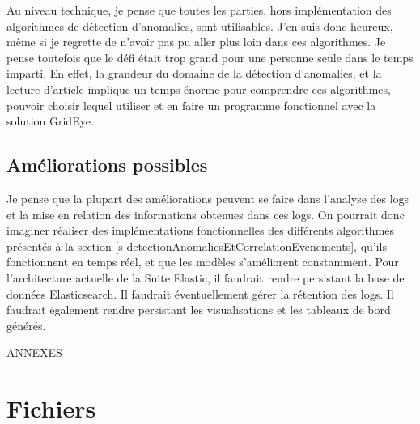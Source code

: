 \documentclass[paper=a4, fontsize=11pt]{scrartcl}
\begin{document}
Au niveau technique, je pense que toutes les parties, hors implémentation des algorithmes de détection d'anomalies, sont utilisables. J'en suis donc heureux, même si je regrette de n'avoir pas pu aller plus loin dans ces algorithmes. Je pense toutefois que le défi était trop grand pour une personne seule dans le temps imparti. En effet, la grandeur du domaine de la détection d'anomalies, et la lecture d'article implique un temps énorme pour comprendre ces algorithmes, pouvoir choisir lequel utiliser et en faire un programme fonctionnel avec la solution GridEye.

\subsection{Améliorations possibles}
Je pense que la plupart des améliorations peuvent se faire dans l'analyse des logs et la mise en relation des informations obtenues dans ces logs. On pourrait donc imaginer réaliser des implémentations fonctionnelles des différents algorithmes présentés à la section \ref{s-detectionAnomaliesEtCorrelationEvenements}, qu'ils fonctionnent en temps réel, et que les modèles s'améliorent constamment. \newline
Pour l'architecture actuelle de la Suite Elastic, il faudrait rendre persistant la base de données Elasticsearch. Il faudrait éventuellement gérer la rétention des logs. Il faudrait également rendre persistant les visualisations et les tableaux de bord générés.


\newpage

\thispagestyle{empty}
\centering
\vspace{10cm}
{\huge ANNEXES}


\newpage

\appendix
\renewcommand\thesection{\Alph{section}}


\justify

\listoftables
{}
\newpage

\listoffigures
{}
\newpage

\printbibliography
\newpage

\section{Fichiers}
\end{document}
